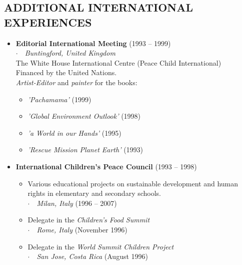 \documentclass[line,margin]{res}
\newcommand{\placestyle}[1]{\footnotesize $\cdot$\ \ {\emph{#1}}}
\newcommand{\datestyle}[1]{{\tiny \dotfill} {\small (#1)}}
\begin{document}
\begin{resume}
\section{ADDITIONAL INTERNATIONAL EXPERIENCES}
\begin{itemize}
\item {
  {\bf Editorial International Meeting} \datestyle{1993 -- 1999} \\
  { \placestyle{Buntingford, United Kingdom} } \\
  The White House International Centre (Peace Child International) \\
  Financed by the United Nations. \\
  \emph{Artist-Editor} and \emph{painter} for the books:
  \begin{itemize}
  \item \emph{'Pachamama'} \datestyle{1999}
  \item \emph{'Global Environment Outlook'} \datestyle{1998}
  \item \emph{'a World in our Hands'} \datestyle{1995}
  \item \emph{'Rescue Mission Planet Earth'} \datestyle{1993}
  \end{itemize}
}
\item {
  {\bf International Children's Peace Council} \datestyle{1993 -- 1998}
  \begin{itemize}
  \item \raggedright Various educational projects on sustainable development and human rights in elementary and secondary schools. \\
    { \placestyle{Milan, Italy} \datestyle{1996 -- 2007} }
  \item Delegate in the \emph{Children's Food Summit} \\
    { \placestyle{Rome, Italy} \datestyle{November 1996} }
  \item Delegate in the \emph{World Summit Children Project} \\
    { \placestyle{San Jose, Costa Rica} \datestyle{August 1996} }
  \end{itemize}
}
\end{itemize}

\end{resume}
\end{document}
